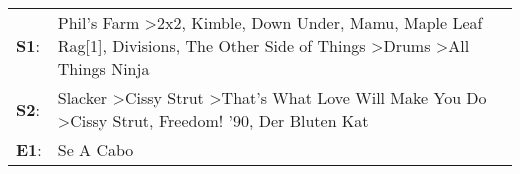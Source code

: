 \begin{supertabular}{p{0.03\textwidth}p{0.92\textwidth}}
 \textbf{S1}:  &  Phil's Farm\textsuperscript{} \textgreater \enspace 2x2\textsuperscript{}, \enspace Kimble\textsuperscript{}, \enspace Down Under\textsuperscript{}, \enspace Mamu\textsuperscript{}, \enspace Maple Leaf Rag[1]\textsuperscript{}, \enspace Divisions\textsuperscript{}, \enspace The Other Side of Things\textsuperscript{} \textgreater \enspace Drums\textsuperscript{} \textgreater \enspace All Things Ninja\textsuperscript{}  \enspace  \\
 \textbf{S2}:  &                                                                                                                                       Slacker\textsuperscript{} \textgreater \enspace Cissy Strut\textsuperscript{} \textgreater \enspace That's What Love Will Make You Do\textsuperscript{} \textgreater \enspace Cissy Strut\textsuperscript{}, \enspace Freedom! '90\textsuperscript{}, \enspace Der Bluten Kat\textsuperscript{}  \enspace  \\
 \textbf{E1}:  &                                                                                                                                                                                                                                                                                                                                                                                                           Se A Cabo\textsuperscript{}  \enspace  \\
\end{supertabular}
